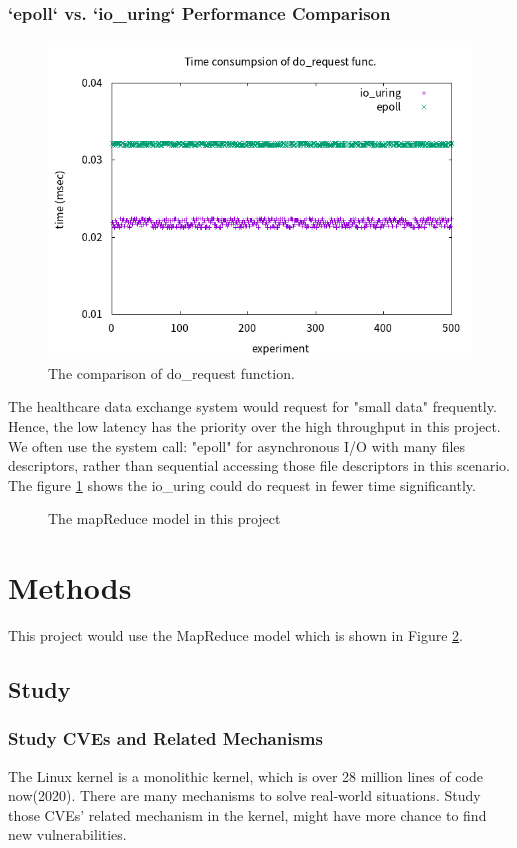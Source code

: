 \documentclass[12pt,a4paper]{article}
\begin{document}
\subsubsection{`epoll` vs. `io\_uring` Performance Comparison}
\begin{figure}
  \includegraphics[width=.45\textwidth]{io_uring.png}
  \caption{The comparison of do\_request function.}
  \label{Fig:iouring}
\end{figure}
The healthcare data exchange system would request for "small data" frequently.
Hence, the low latency has the priority over the high throughput in this project.
We often use the system call: "epoll" for asynchronous I/O with many files
descriptors, rather than sequential accessing those file descriptors in this scenario.
The figure \ref*{Fig:iouring} \cite{epoll_vs_iouring} shows the io\_uring could do request in fewer time
significantly.
\begin{figure}
  \caption[]{The mapReduce model in this project}
  \label{Fig:model}
\end{figure}

\section{Methods}

This project would use the MapReduce model which is shown in Figure \ref*{Fig:model}.

\subsection{Study}
\subsubsection{Study CVEs and Related Mechanisms}
The Linux kernel is a monolithic kernel, which is over 28 million lines of code now(2020). There
are many mechanisms to solve real-world situations. Study those CVEs' related mechanism in the
kernel, might have more chance to find new vulnerabilities.
\end{document}
